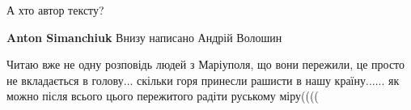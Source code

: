  
 
 
 
 

\qqSecCmt


А хто автор тексту?

\begin{itemize} %
\textbf{Anton Simanchiuk} Внизу написано Андрій Волошин
\end{itemize} %


Читаю вже не одну розповідь людей з Маріуполя, що вони пережили, це просто не
вкладається в голову... скільки горя принесли рашисти в нашу країну...... як
можно після всього цього пережитого радіти руському міру((((

